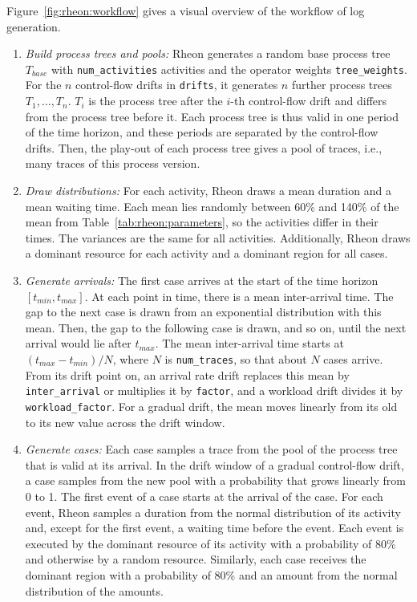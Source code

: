 Figure~\ref{fig:rheon:workflow} gives a visual overview of the workflow of log generation.
\begin{enumerate}
    \item \emph{Build process trees and pools:} Rheon generates a random base process tree $T_{\mathit{base}}$ with \texttt{num\_activities} activities and the operator weights \texttt{tree\_weights}. For the $n$ control-flow drifts in \texttt{drifts}, it generates $n$ further process trees $T_1, \dots, T_n$. $T_i$ is the process tree after the $i$-th control-flow drift and differs from the process tree before it. Each process tree is thus valid in one period of the time horizon, and these periods are separated by the control-flow drifts. Then, the play-out of each process tree gives a pool of traces, i.e., many traces of this process version.

    \item \emph{Draw distributions:} For each activity, Rheon draws a mean duration and a mean waiting time. Each mean lies randomly between 60\% and 140\% of the mean from Table~\ref{tab:rheon:parameters}, so the activities differ in their times. The variances are the same for all activities. Additionally, Rheon draws a dominant resource for each activity and a dominant region for all cases.

    \item \emph{Generate arrivals:} The first case arrives at the start of the time horizon $[t_{\mathit{min}}, t_{\mathit{max}}]$. At each point in time, there is a mean inter-arrival time. The gap to the next case is drawn from an exponential distribution with this mean. Then, the gap to the following case is drawn, and so on, until the next arrival would lie after $t_{\mathit{max}}$. The mean inter-arrival time starts at $(t_{\mathit{max}} - t_{\mathit{min}}) / N$, where $N$ is \texttt{num\_traces}, so that about $N$ cases arrive. From its drift point on, an arrival rate drift replaces this mean by \texttt{inter\_arrival} or multiplies it by \texttt{factor}, and a workload drift divides it by \texttt{workload\_factor}. For a gradual drift, the mean moves linearly from its old to its new value across the drift window.

    \item \emph{Generate cases:} Each case samples a trace from the pool of the process tree that is valid at its arrival. In the drift window of a gradual control-flow drift, a case samples from the new pool with a probability that grows linearly from 0 to 1. The first event of a case starts at the arrival of the case. For each event, Rheon samples a duration from the normal distribution of its activity and, except for the first event, a waiting time before the event. Each event is executed by the dominant resource of its activity with a probability of 80\% and otherwise by a random resource. Similarly, each case receives the dominant region with a probability of 80\% and an amount from the normal distribution of the amounts.


\end{enumerate}

